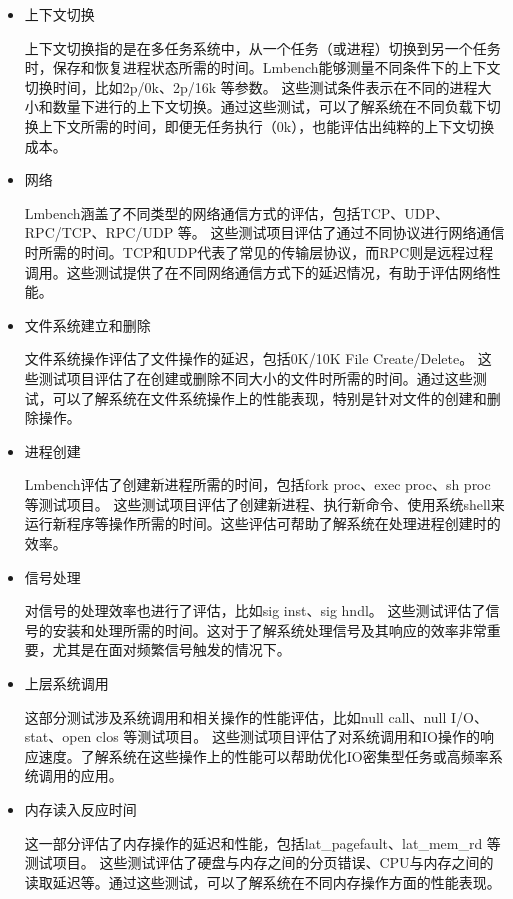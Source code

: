 \begin{itemize}
	
	\item  上下文切换
	
	上下文切换指的是在多任务系统中，从一个任务（或进程）切换到另一个任务时，保存和恢复进程状态所需的时间。Lmbench能够测量不同条件下的上下文切换时间，比如2p/0k、2p/16k 等参数。 这些测试条件表示在不同的进程大小和数量下进行的上下文切换。通过这些测试，可以了解系统在不同负载下切换上下文所需的时间，即便无任务执行（0k），也能评估出纯粹的上下文切换成本。
	
	\item 网络
	
	Lmbench涵盖了不同类型的网络通信方式的评估，包括TCP、UDP、RPC/TCP、RPC/UDP 等。 这些测试项目评估了通过不同协议进行网络通信时所需的时间。TCP和UDP代表了常见的传输层协议，而RPC则是远程过程调用。这些测试提供了在不同网络通信方式下的延迟情况，有助于评估网络性能。
	
	\item 文件系统建立和删除
	
	文件系统操作评估了文件操作的延迟，包括0K/10K File Create/Delete。 这些测试项目评估了在创建或删除不同大小的文件时所需的时间。通过这些测试，可以了解系统在文件系统操作上的性能表现，特别是针对文件的创建和删除操作。
	
	\item 进程创建
	
	Lmbench评估了创建新进程所需的时间，包括fork proc、exec proc、sh proc 等测试项目。 这些测试项目评估了创建新进程、执行新命令、使用系统shell来运行新程序等操作所需的时间。这些评估可帮助了解系统在处理进程创建时的效率。
	
	\item 信号处理
	
	对信号的处理效率也进行了评估，比如sig inst、sig hndl。 这些测试评估了信号的安装和处理所需的时间。这对于了解系统处理信号及其响应的效率非常重要，尤其是在面对频繁信号触发的情况下。
	
	\item 上层系统调用
	
	这部分测试涉及系统调用和相关操作的性能评估，比如null call、null I/O、stat、open clos 等测试项目。 这些测试项目评估了对系统调用和IO操作的响应速度。了解系统在这些操作上的性能可以帮助优化IO密集型任务或高频率系统调用的应用。
	
	\item 内存读入反应时间
	
	这一部分评估了内存操作的延迟和性能，包括lat\_pagefault、lat\_mem\_rd 等测试项目。 这些测试评估了硬盘与内存之间的分页错误、CPU与内存之间的读取延迟等。通过这些测试，可以了解系统在不同内存操作方面的性能表现。
	
\end{itemize}

